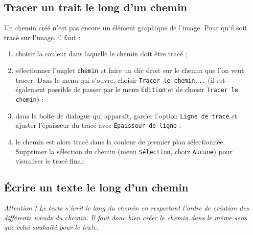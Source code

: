 




\subsection{Tracer un trait le long d'un chemin}\label{Gimp3cheminTracer} 

Un chemin créé n'est pas encore un élément graphique de l'image. Pour qu'il soit tracé sur l'image, il faut : 

\begin{enumerate}
\item choisir la couleur dans laquelle le chemin doit être tracé ;
\item sélectionner l'onglet \texttt{chemin} et faire un clic droit sur le chemin que l'on veut tracer. Dans le menu qui s'ouvre, choisir \texttt{Tracer le chemin...} (il est également possible de passer par le menu \texttt{Édition} et de choisir \texttt{Tracer le chemin}) : 
\item dans la boîte de dialogue qui apparaît, garder l'option \texttt{Ligne de tracé} et ajuster l'épaisseur du tracé avec \texttt{Épaisseur de ligne} :
\item le chemin est alors tracé dans la couleur de premier plan sélectionnée. Supprimer la sélection du chemin (menu \texttt{Sélection}, choix \texttt{Aucune}) pour visualiser le tracé final:
\end{enumerate}

\subsection{Écrire un texte le long d'un chemin}\label{Gimp3cheminTexte} 

\emph{Attention ! Le texte s'écrit le long du chemin en respectant l'ordre de création des différents nœuds du chemin. Il faut donc bien créer le chemin dans le même sens que celui souhaité pour le texte.}

